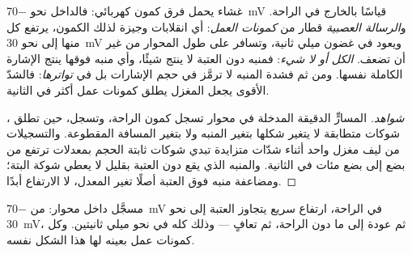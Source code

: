 \begin{proposition}\label{prop:g12:stretch-reflex:actionpotential}
غشاء  يحمل فرق كمون كهربائي: فالداخل نحو \qty{-70}{mV} قياسًا
بالخارج في الراحة. و\emph{الرسالة العصبية} قطار من
\emph{كمونات العمل}: أي انقلابات وجيزة لذلك الكمون،
يرتفع كل منها إلى نحو \qty{+30}{mV} ويعود في غضون ميلي ثانية، وتسافر
على طول المحوار من غير أن تضعف.  \emph{الكل أو لا شيء}: فمنبه
دون العتبة لا ينتج شيئًا، وأي منبه فوقها ينتج الإشارة الكاملة نفسها.
ومن ثم فشدة المنبه لا ترمَّز في حجم الإشارات بل في \emph{تواترها}: فالشدّ
الأقوى يجعل المغزل يطلق كمونات عمل أكثر في الثانية.
\end{proposition}
\begin{proof}[شواهد]
المسارٍّ الدقيقة المدخلة في محوار تسجل كمون الراحة، وتسجل، حين تطلق
، شوكات متطابقة لا يتغير شكلها بتغير المنبه ولا بتغير المسافة
المقطوعة. والتسجيلات من ليف مغزل واحد أثناء شدّات متزايدة تبدي شوكات
ثابتة الحجم بمعدلات ترتفع من بضع إلى بضع مئات في الثانية. والمنبه الذي
يقع دون العتبة بقليل لا يعطي شوكة البتة؛ ومضاعفة منبه فوق العتبة أصلًا
تغير المعدل، لا الارتفاع أبدًا.
\end{proof}

\begin{omfigure}

{\small {} مسجَّل داخل محوار: من \qty{-70}{mV} في الراحة، ارتفاع
سريع يتجاوز العتبة إلى نحو \qty{+30}{mV}، ثم عودة إلى ما دون الراحة،
ثم تعافٍ --- وذلك كله في نحو ميلي ثانيتين. وكل كمونات عمل  بعينه
لها هذا الشكل نفسه.}
\end{omfigure}


